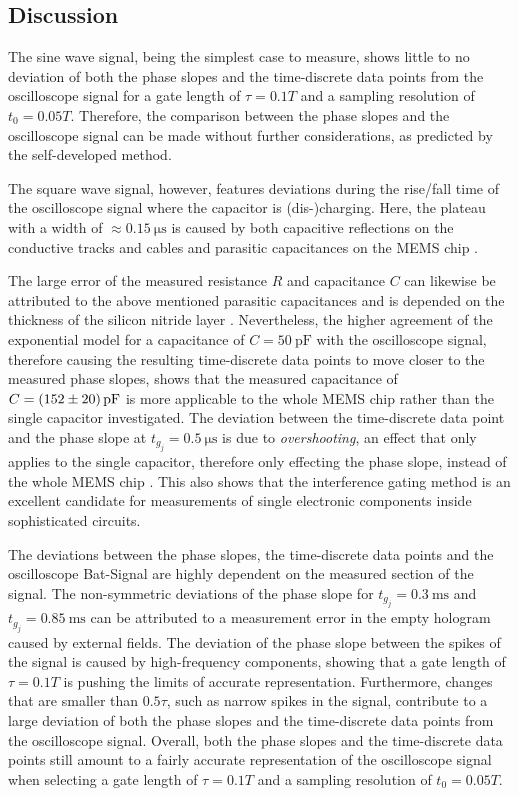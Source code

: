 \subsection{Discussion} \label{ssec:application-discussion}
The sine wave signal, being the simplest case to measure, shows little to no deviation of both the phase slopes and the time-discrete data points from the oscilloscope signal for a gate length of $\tau = 0.1T$ and a sampling resolution of $t_0 = 0.05T$. Therefore, the comparison between the phase slopes and the oscilloscope signal can be made without further considerations, as predicted by the self-developed method.

The square wave signal, however, features deviations during the rise/fall time of the oscilloscope signal where the capacitor is (dis-)charging. Here, the plateau with a width of $\approx \SI{0.15}{\micro\second}$ is caused by both capacitive reflections on the conductive tracks and cables \cite{carr2001} and parasitic capacitances on the MEMS chip \cite{Wagner2018}.

The large error of the measured resistance $R$ and capacitance $C$ can likewise be attributed to the above mentioned parasitic capacitances and is depended on the thickness of the silicon nitride layer \cite{Wagner2018}. Nevertheless, the higher agreement of the exponential model for a capacitance of $C = \SI{50}{\pico\farad}$ with the oscilloscope signal, therefore causing the resulting time-discrete data points to move closer to the measured phase slopes, shows that the measured capacitance of $C = \SI{152 \pm 20}{\pico\farad}$ is more applicable to the whole MEMS chip rather than the single capacitor investigated. The deviation between the time-discrete data point and the phase slope at $t_{g_j} = \SI{0.5}{\micro\second}$ is due to \emph{overshooting}, an effect that only applies to the single capacitor, therefore only effecting the phase slope, instead of the whole MEMS chip \cite{Stewart2006}. This also shows that the interference gating method is an excellent candidate for measurements of single electronic components inside sophisticated circuits.

The deviations between the phase slopes, the time-discrete data points and the oscilloscope Bat-Signal are highly dependent on the measured section of the signal. The non-symmetric deviations of the phase slope for $t_{g_j} = \SI{0.3}{\milli\second}$ and $t_{g_j} = \SI{0.85}{\milli\second}$ can be attributed to a measurement error in the empty hologram caused by external fields. The deviation of the phase slope between the spikes of the signal is caused by high-frequency components, showing that a gate length of $\tau = 0.1T$ is pushing the limits of accurate representation. Furthermore, changes that are smaller than $0.5\tau$, such as narrow spikes in the signal, contribute to a large deviation of both the phase slopes and the time-discrete data points from the oscilloscope signal. Overall, both the phase slopes and the time-discrete data points still amount to a fairly accurate representation of the oscilloscope signal when selecting a gate length of $\tau = 0.1T$ and a sampling resolution of $t_0 = 0.05T$.

